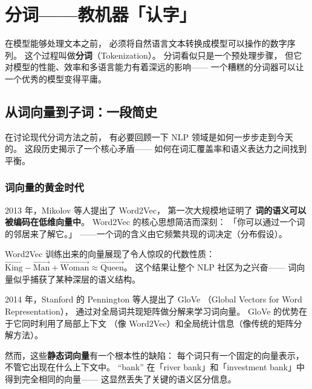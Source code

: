 \chapter{分词——教机器「认字」}
\label{ch:tokenization}

在模型能够处理文本之前，
必须将自然语言文本转换成模型可以操作的数字序列。
这个过程叫做\textbf{分词}（Tokenization）。
分词看似只是一个预处理步骤，
但它对模型的性能、效率和多语言能力有着深远的影响——
一个糟糕的分词器可以让一个优秀的模型变得平庸。

\section{从词向量到子词：一段简史}

在讨论现代分词方法之前，
有必要回顾一下 NLP 领域是如何一步步走到今天的。
这段历史揭示了一个核心矛盾——
如何在词汇覆盖率和语义表达力之间找到平衡。

\subsection{词向量的黄金时代}

2013 年，Mikolov 等人提出了 Word2Vec，
第一次大规模地证明了
\textbf{词的语义可以被编码在低维向量中}。
Word2Vec 的核心思想简洁而深刻：
「你可以通过一个词的邻居来了解它。」
——一个词的含义由它频繁共现的词决定（分布假设）。

Word2Vec 训练出来的向量展现了令人惊叹的代数性质：
$\vec{\text{King}} - \vec{\text{Man}} + \vec{\text{Woman}} \approx \vec{\text{Queen}}$。
这个结果让整个 NLP 社区为之兴奋——
词向量似乎捕获了某种深层的语义结构。

2014 年，Stanford 的 Pennington 等人提出了 GloVe
（Global Vectors for Word Representation），
通过对全局词共现矩阵做分解来学习词向量。
GloVe 的优势在于它同时利用了局部上下文
（像 Word2Vec）和全局统计信息（像传统的矩阵分解方法）。

然而，这些\textbf{静态词向量}有一个根本性的缺陷：
每个词只有一个固定的向量表示，
不管它出现在什么上下文中。
``bank'' 在「river bank」和「investment bank」中
得到完全相同的向量——
这显然丢失了关键的语义区分信息。

